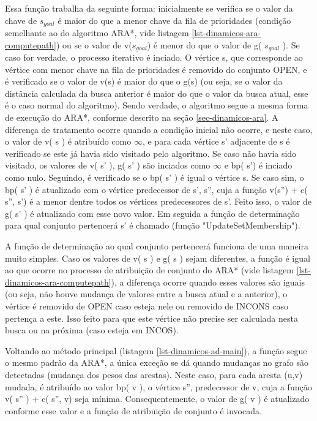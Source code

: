 Essa função trabalha da seguinte forma: inicialmente se verifica se o valor da chave de $s_{goal}$ é maior do que a menor chave da fila de prioridades (condição semelhante ao do algoritmo ARA*, vide listagem \ref{lst-dinamicos-ara-computepath}) ou se o valor de v($s_{goal}$) é menor do que o valor de g( $s_{goal}$ ). Se caso for verdade, o processo iterativo é inciado. O vértice s, que corresponde ao vértice com menor chave na fila de prioridades é removido do conjunto OPEN, e é verificado se o valor de v(s) é maior do que o g(s) (ou seja, se o valor da distância calculada da busca anterior é maior do que o valor da busca atual, esse é o caso normal do algoritmo). Sendo verdade, o algoritmo segue a mesma forma de execução do ARA*, conforme descrito na seção \ref{sec-dinamicos-ara}. A diferença de tratamento ocorre quando a condição inicial não ocorre, e neste caso, o valor de v( s ) é atribuído como $\infty$, e para cada vértice s' adjacente de s é verificado se este já havia sido visitado pelo algoritmo. Se caso não havia sido visitado, os valores de v( s' ), g( s' ) são inciados como $\infty$ e bp( s') é inciado como nulo. Seguindo, é verificado se o bp( s' ) é igual o vértice s. Se caso sim, o bp( s' ) é atualizado com o vértice predecessor de s', s'', cuja a função v(s'') + c( s'', s') é a menor dentre todos os vértices predecessores de s'. Feito isso, o valor de g( s' ) é atualizado com esse novo valor. Em seguida a função de determinação para qual conjunto pertencerá s' é chamado (função "UpdateSetMembership").

A função de determinação ao qual conjunto pertencerá funciona de uma maneira muito simples. Caso os valores de v( s ) e g( s ) sejam diferentes, a função é igual ao que ocorre no processo de atribuição de conjunto do ARA* (vide listagem \ref{lst-dinamicos-ara-computepath}), a diferença ocorre quando esses valores são iguais (ou seja, não houve mudança de valores entre a busca atual e a anterior), o vértice é removido de OPEN caso esteja nele ou removido de INCONS caso pertença a este. Isso feito para que este vértice não precise ser calculada nesta busca ou na próxima (caso esteja em INCOS).

Voltando ao método principal (listagem \ref{lst-dinamicos-ad-main}), a função segue o mesmo padrão da ARA*, a única exceção se dá quando mudanças no grafo são detectadas (mudança dos pesos das arestas). Neste caso, para cada aresta (u,v) mudada, é atribuído ao valor bp( v ), o vértice s'', predecessor de v, cuja a função v( s'' ) + c( s'', v) seja mínima. Consequentemente, o valor de g( v ) é atualizado conforme esse valor e a função de atribuição de conjunto é invocada. 
